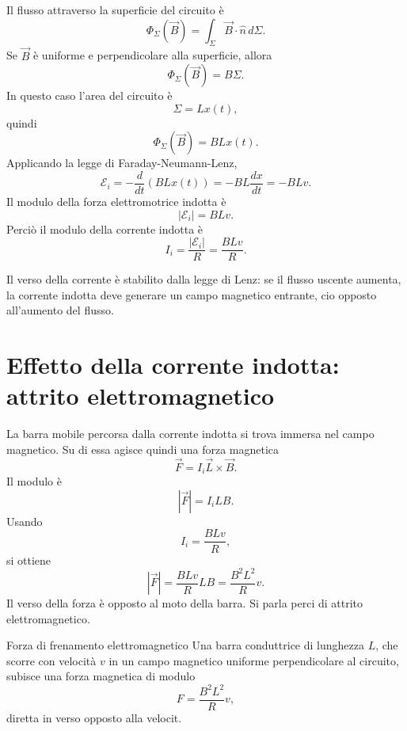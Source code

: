 \documentclass[a4paper]{article}
\begin{document}
\begin{center}
\end{center}

Il flusso attraverso la superficie del circuito è
\[
\Phi_\Sigma(\vec{B})=\int_\Sigma \vec{B}\cdot\hat{n}\,d\Sigma.
\]
Se \(\vec{B}\) è uniforme e perpendicolare alla superficie, allora
\[
\Phi_\Sigma(\vec{B})=B\Sigma.
\]
In questo caso l'area del circuito è
\[
\Sigma=Lx(t),
\]
quindi
\[
\Phi_\Sigma(\vec{B})=BLx(t).
\]
Applicando la legge di Faraday-Neumann-Lenz,
\[
\mathcal{E}_i=-\frac{d}{dt}\left(BLx(t)\right)=-BL\frac{dx}{dt}=-BLv.
\]
Il modulo della forza elettromotrice indotta è
\[
|\mathcal{E}_i|=BLv.
\]
Perciò il modulo della corrente indotta è
\[
I_i=\frac{|\mathcal{E}_i|}{R}=\frac{BLv}{R}.
\]

Il verso della corrente è stabilito dalla legge di Lenz: se il flusso uscente aumenta, la corrente indotta deve generare un campo magnetico entrante, cio opposto all'aumento del flusso.

\section{Effetto della corrente indotta: attrito elettromagnetico}

La barra mobile percorsa dalla corrente indotta si trova immersa nel campo magnetico. Su di essa agisce quindi una forza magnetica
\[
\vec{F}=I_i\vec{L}\times\vec{B}.
\]
Il modulo è
\[
|\vec{F}|=I_iLB.
\]
Usando
\[
I_i=\frac{BLv}{R},
\]
si ottiene
\[
|\vec{F}|=\frac{BLv}{R}LB=\frac{B^2L^2}{R}v.
\]
Il verso della forza è opposto al moto della barra. Si parla perci di attrito elettromagnetico.

\begin{snippetproposition}{Forza di frenamento elettromagnetico}
Una barra conduttrice di lunghezza \(L\), che scorre con velocità \(v\) in un campo magnetico uniforme perpendicolare al circuito, subisce una forza magnetica di modulo
\[
    F=\frac{B^2L^2}{R}v,
\]
diretta in verso opposto alla velocit.
\end{snippetproposition}
\end{document}
